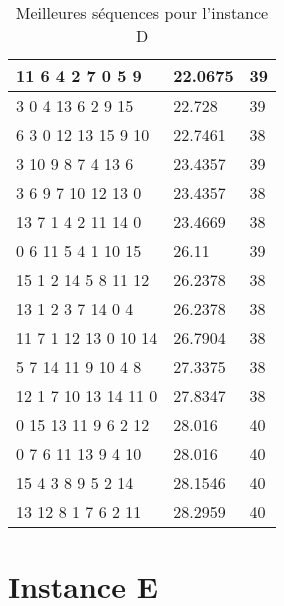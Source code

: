 \begin{table}[H]
\begin{tabular}{|l|l|l|}
		11 6 4 2 7 0 5 9     & 22.0675 & 39      \\ \hline
		3 0 4 13 6 2 9 15    & 22.728  & 39      \\ \hline
		6 3 0 12 13 15 9 10  & 22.7461 & 38      \\ \hline
		3 10 9 8 7 4 13 6    & 23.4357 & 39      \\ \hline
		3 6 9 7 10 12 13 0   & 23.4357 & 38      \\ \hline
		13 7 1 4 2 11 14 0   & 23.4669 & 38      \\ \hline
		0 6 11 5 4 1 10 15   & 26.11   & 39      \\ \hline
		15 1 2 14 5 8 11 12  & 26.2378 & 38      \\ \hline
		13 1 2 3 7 14 0 4    & 26.2378 & 38      \\ \hline
		11 7 1 12 13 0 10 14 & 26.7904 & 38      \\ \hline
		5 7 14 11 9 10 4 8   & 27.3375 & 38      \\ \hline
		12 1 7 10 13 14 11 0 & 27.8347 & 38      \\ \hline
		0 15 13 11 9 6 2 12  & 28.016  & 40      \\ \hline
		0 7 6 11 13 9 4 10   & 28.016  & 40      \\ \hline
		15 4 3 8 9 5 2 14    & 28.1546 & 40      \\ \hline
		13 12 8 1 7 6 2 11   & 28.2959 & 40      \\ \hline
		\end{tabular}
		\caption{Meilleures séquences pour l'instance D}
		\label{tab:best-seq-instanceD}
	\end{table}


	\section*{Instance E}


